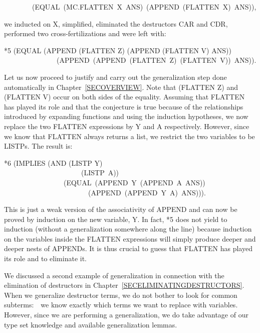 \documentclass[10pt]{book}
\newenvironment{pubasis}{\begin{flushleft}}{\end{flushleft}}
\begin{document}
\begin{pubasis}
~~~~~~~~(EQUAL~(MC.FLATTEN~X~ANS)~(APPEND~(FLATTEN~X)~ANS)),\\
\end{pubasis}
we inducted on X, simplified, eliminated the destructors CAR and CDR,
performed two cross-fertilizations and were left with:

\begin{pubasis}
*5	(EQUAL (APPEND (FLATTEN Z) (APPEND (FLATTEN V) ANS))\\
~~~~~~~~~~~~~~~(APPEND~(APPEND~(FLATTEN~Z)~(FLATTEN~V))~ANS)).\\
\end{pubasis}
Let us now proceed to justify and carry out the generalization step
done automatically in Chapter~\ref{SECOVERVIEW}.
Note that (FLATTEN Z) and (FLATTEN V) occur on both sides
of the equality.  Assuming  that FLATTEN has played its role and that
the conjecture is true because of the relationships introduced by expanding functions and
using the induction hypotheses, we now replace the two
FLATTEN expressions by Y and A respectively.
However, since we know that FLATTEN
always returns a list, we restrict the two variables to be LISTPs.
The result is:

\begin{pubasis}
*6	(IMPLIES (AND (LISTP Y)\\
~~~~~~~~~~~~~~~~~~~~~~(LISTP~A))\\
~~~~~~~~~~~~~~~~~(EQUAL~(APPEND~Y~(APPEND~A~ANS))\\
~~~~~~~~~~~~~~~~~~~~~~~~(APPEND~(APPEND~Y~A)~ANS))).\\
\end{pubasis}
This is just a weak version of the associativity of APPEND and can now be proved
by induction on the new variable, Y.  In fact, *5 
does not yield to induction
(without a generalization somewhere along the line) because
induction on the variables inside the FLATTEN expressions will simply
produce deeper and deeper nests of APPENDs.  It is thus
crucial to guess that FLATTEN has played its role and to eliminate it.

We discussed a second example of generalization
in connection with the elimination of destructors in Chapter~\ref{SECELIMINATINGDESTRUCTORS}.  When
we generalize destructor terms, we do not bother to look for
common subterms:~~we know exactly which terms we want to replace
with variables.
However, since we are performing
a generalization, we do take advantage of our type set knowledge and
available generalization lemmas.
\end{document}
